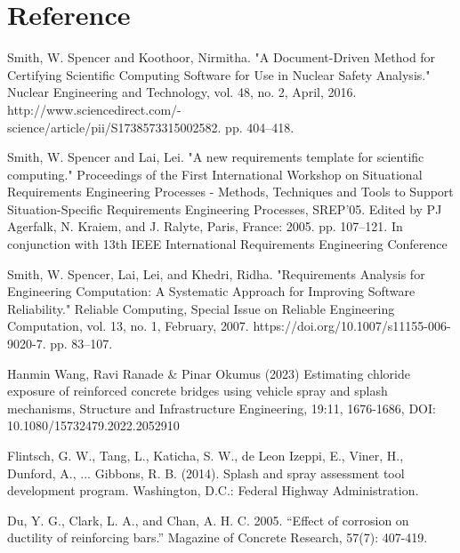 \documentclass[12pt]{article}
\newcounter{refnum} %
\begin{document}
\section*{Reference}
\begin{enumerate}[label={[\arabic*]}]
\item {} \label{ref1}
Smith, W. Spencer and Koothoor, Nirmitha. "A Document-Driven Method for Certifying Scientific Computing Software for Use in Nuclear Safety Analysis." Nuclear Engineering and Technology, vol. 48, no. 2, April, 2016. http://www.sciencedirect.com/-\\science/article/pii/S1738573315002582. pp. 404–418.

\item {} \label{ref2}
Smith, W. Spencer and Lai, Lei. "A new requirements template for scientific computing." Proceedings of the First International Workshop on Situational Requirements Engineering Processes - Methods, Techniques and Tools to Support Situation-Specific Requirements Engineering Processes, SREP'05. Edited by PJ Agerfalk, N. Kraiem, and J. Ralyte, Paris, France: 2005. pp. 107–121. In conjunction with 13th IEEE International Requirements Engineering Conference

\item {} \label{ref3}
Smith, W. Spencer, Lai, Lei, and Khedri, Ridha. "Requirements Analysis for Engineering Computation: A Systematic Approach for Improving Software Reliability." Reliable Computing, Special Issue on Reliable Engineering Computation, vol. 13, no. 1, February, 2007. https://doi.org/10.1007/s11155-006-9020-7. pp. 83–107.

\item {} \label{ref4}
Hanmin Wang, Ravi Ranade \& Pinar Okumus (2023) Estimating chloride exposure of reinforced concrete bridges using vehicle spray and splash mechanisms, Structure and Infrastructure Engineering, 19:11, 1676-1686, DOI: 10.1080/15732479.2022.2052910

\item {} \label{ref5}
Flintsch, G. W., Tang, L., Katicha, S. W., de Leon Izeppi, E., Viner, H., Dunford, A., ... Gibbons, R. B. (2014). Splash and spray assessment tool development program. Washington, D.C.: Federal Highway Administration.

\item {} \label{ref6}
Du, Y. G., Clark, L. A., and Chan, A. H. C. 2005. “Effect of corrosion on ductility of reinforcing bars.” Magazine of Concrete Research, 57(7): 407-419.


\end{enumerate}
\end{document}
